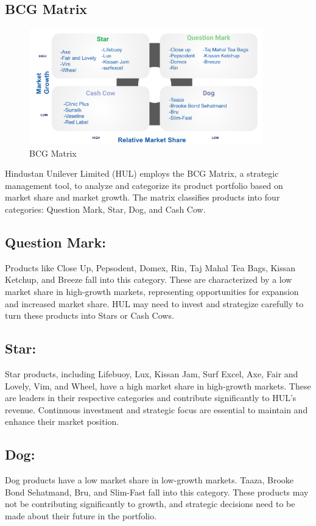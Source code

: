 \subsection{BCG Matrix}
\begin{figure}[h]
    \centering
    \includegraphics[width=0.9\textwidth]{images/BCG Matrix.png}
    \caption{BCG Matrix}
    \label{fig:BCG Matrix}
  \end{figure}

Hindustan Unilever Limited (HUL) employs the BCG Matrix, a strategic management tool, to analyze and categorize its product portfolio based on market share and market growth. The matrix classifies products into four categories: Question Mark, Star, Dog, and Cash Cow.

\subsection*{Question Mark:
}Products like Close Up, Pepsodent, Domex, Rin, Taj Mahal Tea Bags, Kissan Ketchup, and Breeze fall into this category. These are characterized by a low market share in high-growth markets, representing opportunities for expansion and increased market share. HUL may need to invest and strategize carefully to turn these products into Stars or Cash Cows.

\subsection*{Star:}
Star products, including Lifebuoy, Lux, Kissan Jam, Surf Excel, Axe, Fair and Lovely, Vim, and Wheel, have a high market share in high-growth markets. These are leaders in their respective categories and contribute significantly to HUL's revenue. Continuous investment and strategic focus are essential to maintain and enhance their market position.

\subsection*{Dog:}
Dog products have a low market share in low-growth markets. Taaza, Brooke Bond Sehatmand, Bru, and Slim-Fast fall into this category. These products may not be contributing significantly to growth, and strategic decisions need to be made about their future in the portfolio.

